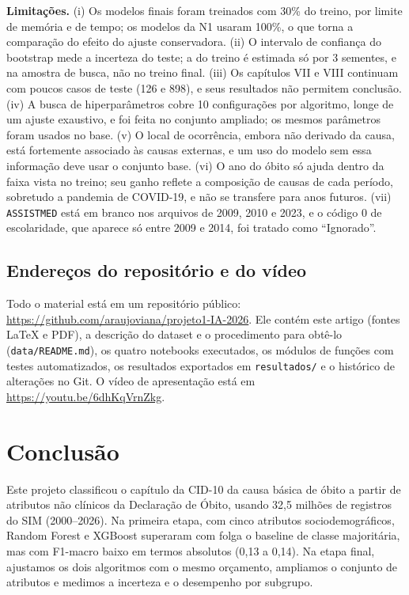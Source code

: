 \documentclass[12pt]{article}
\begin{document}
\textbf{Limitações.} (i) Os modelos finais foram treinados com 30\% do treino, por limite de memória e de tempo; os modelos da N1 usaram 100\%, o que torna a comparação do efeito do ajuste conservadora. (ii) O intervalo de confiança do bootstrap mede a incerteza do teste; a do treino é estimada só por 3 sementes, e na amostra de busca, não no treino final. (iii) Os capítulos VII e VIII continuam com poucos casos de teste (126 e 898), e seus resultados não permitem conclusão. (iv) A busca de hiperparâmetros cobre 10 configurações por algoritmo, longe de um ajuste exaustivo, e foi feita no conjunto ampliado; os mesmos parâmetros foram usados no base. (v) O local de ocorrência, embora não derivado da causa, está fortemente associado às causas externas, e um uso do modelo sem essa informação deve usar o conjunto base. (vi) O ano do óbito só ajuda dentro da faixa vista no treino; seu ganho reflete a composição de causas de cada período, sobretudo a pandemia de COVID-19, e não se transfere para anos futuros. (vii) \texttt{ASSISTMED} está em branco nos arquivos de 2009, 2010 e 2023, e o código 0 de escolaridade, que aparece só entre 2009 e 2014, foi tratado como ``Ignorado''.

\subsection{Endereços do repositório e do vídeo}

Todo o material está em um repositório público: \url{https://github.com/araujoviana/projeto1-IA-2026}. Ele contém este artigo (fontes LaTeX e PDF), a descrição do dataset e o procedimento para obtê-lo (\texttt{data/README.md}), os quatro notebooks executados, os módulos de funções com testes automatizados, os resultados exportados em \texttt{resultados/} e o histórico de alterações no Git. O vídeo de apresentação está em \url{https://youtu.be/6dhKqVrnZkg}.

\section{Conclusão}

Este projeto classificou o capítulo da CID-10 da causa básica de óbito a partir de atributos não clínicos da Declaração de Óbito, usando 32,5 milhões de registros do SIM (2000--2026). Na primeira etapa, com cinco atributos sociodemográficos, Random Forest e XGBoost superaram com folga o baseline de classe majoritária, mas com F1-macro baixo em termos absolutos (0,13 a 0,14). Na etapa final, ajustamos os dois algoritmos com o mesmo orçamento, ampliamos o conjunto de atributos e medimos a incerteza e o desempenho por subgrupo.
\end{document}
